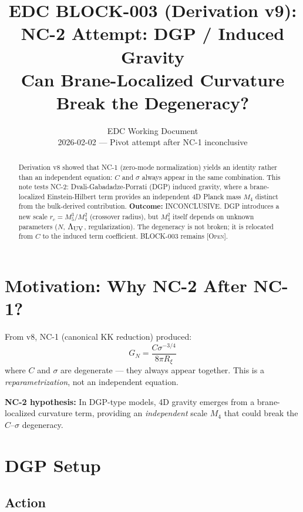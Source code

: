 \documentclass[11pt,a4paper]{article}
\title{\textbf{EDC BLOCK-003 (Derivation v9):}\\[0.3em]
NC-2 Attempt: DGP / Induced Gravity\\[0.3em]
\large Can Brane-Localized Curvature Break the Degeneracy?}
\author{EDC Working Document\\[0.5em]
\small 2026-02-02 --- Pivot attempt after NC-1 inconclusive}
\date{}
\theoremstyle{definition}
\newcommand{\Open}{\textsc{[Open]}}
\begin{document}
\maketitle

\begin{abstract}
Derivation v8 showed that NC-1 (zero-mode normalization) yields an identity
rather than an independent equation: $C$ and $\sigma$ always appear in
the same combination. This note tests NC-2: Dvali-Gabadadze-Porrati (DGP)
induced gravity, where a brane-localized Einstein-Hilbert term provides
an independent 4D Planck mass $M_4$ distinct from the bulk-derived contribution.
\textbf{Outcome:} INCONCLUSIVE. DGP introduces a new scale $r_c = M_5^3/M_4^2$
(crossover radius), but $M_4^2$ itself depends on unknown parameters
($N$, $\Lambda_{\rm UV}$, regularization). The degeneracy is not broken;
it is relocated from $C$ to the induced term coefficient.
BLOCK-003 remains \Open.
\end{abstract}

\tableofcontents
\newpage

\section{Motivation: Why NC-2 After NC-1?}

From v8, NC-1 (canonical KK reduction) produced:
\begin{equation}
G_N = \frac{C \sigma^{-3/4}}{8\pi R_\xi}
\end{equation}
where $C$ and $\sigma$ are degenerate --- they always appear together.
This is a \textit{reparametrization}, not an independent equation.

\textbf{NC-2 hypothesis:} In DGP-type models, 4D gravity emerges from a
brane-localized curvature term, providing an \textit{independent} scale
$M_4$ that could break the $C$--$\sigma$ degeneracy.

\section{DGP Setup}

\subsection{Action}
\end{document}
